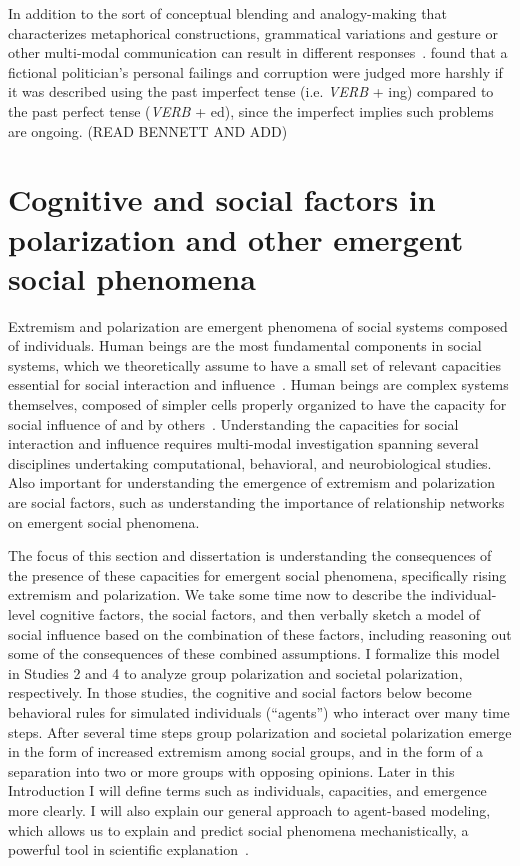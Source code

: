 \documentclass[12pt,letterpaper]{article}
\begin{document}
In addition to the sort of conceptual blending and analogy-making that
characterizes metaphorical constructions, grammatical variations
and gesture or other multi-modal communication 
can result in different responses~\cite{Bennett2008,Matlock2012}. 
 found that a fictional politician's personal failings and
corruption were judged more harshly if it was described using the past 
imperfect tense (i.e. \emph{VERB} + ing) compared to the past perfect tense
(\emph{VERB} + ed), since the imperfect implies such problems are ongoing.
(READ BENNETT AND ADD)



\section{Cognitive and social factors in polarization and other emergent social phenomena}

Extremism and polarization are emergent phenomena of social systems composed
of individuals. Human beings are the most fundamental components in social
systems, which we theoretically assume to have a small set of relevant
capacities essential for social interaction and 
influence~\cite{Cartwright1989,Smaldino2017}. 
Human beings are complex systems themselves,
composed of simpler cells properly organized to have the capacity for
social influence of and by others~\cite{Kello2007,Spivey2020}. Understanding
the capacities for social interaction and influence requires multi-modal
investigation spanning several disciplines undertaking computational,
behavioral, and neurobiological studies. Also important for understanding
the emergence of extremism and polarization are social factors, such as
understanding the importance of relationship networks on emergent
social phenomena.

The focus of this 
section and dissertation is understanding the consequences of the presence of
these capacities for emergent social phenomena, specifically rising extremism
and polarization. We take some time now to describe the individual-level
cognitive factors, the social factors, and then verbally sketch a model
of social influence based on the combination of these factors, including
reasoning out some of the consequences of these combined assumptions. I formalize
this model in Studies 2 and 4 to analyze group polarization and societal 
polarization, respectively. In those studies, the cognitive and social factors
below become behavioral rules for simulated individuals (``agents'') who
interact over many time steps. After several time steps group polarization
and societal polarization emerge in the form of increased extremism among
social groups, and in the form of a separation into two or more 
groups with opposing opinions.  Later in this Introduction I will define
terms such as individuals, capacities, and emergence more clearly. I will also
explain our general approach to agent-based modeling, which allows us to
explain and predict social phenomena mechanistically, a powerful tool in
scientific explanation~\cite{Machamer2000,Craver2006,Turner2020}.
\end{document}
